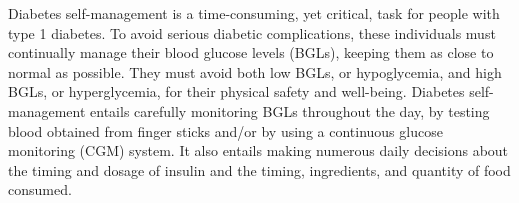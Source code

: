 \documentclass[graybox]{svmult}
\begin{document}

Diabetes self-management is a time-consuming, yet critical, task for people with type 1 diabetes.  To avoid serious diabetic complications, these individuals must continually manage their blood glucose levels (BGLs), keeping them as close to normal as possible.  They must avoid both low BGLs, or hypoglycemia, and high BGLs, or hyperglycemia, for their physical safety and well-being.  Diabetes self-management entails carefully monitoring BGLs throughout the day, by testing blood obtained from finger sticks and/or by using a continuous glucose monitoring (CGM) system.  It also entails making numerous daily decisions about the timing and dosage of insulin and the timing, ingredients, and quantity of food consumed.
\end{document}
